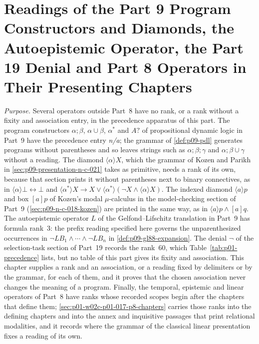 \chapter{Readings of the Part 9 Program Constructors and Diamonds, the Autoepistemic Operator, the Part 19 Denial and Part 8 Operators in Their Presenting Chapters}
\label{sec:p01-w02c-p01-017-readings}

\emph{Purpose.}  Several operators outside Part~8 have no rank,
or a rank without a fixity and association entry, in the precedence
apparatus of this part.  The program constructors \(\alpha;\beta\),
\(\alpha\cup\beta\), \(\alpha^{*}\) and \(A?\) of propositional dynamic
logic in Part~9 have the precedence entry \emph{n/a}; the grammar of
\cref{def:p09-pdl} generates programs without parentheses and so leaves
strings such as \(\alpha;\beta;\gamma\) and \(\alpha;\beta\cup\gamma\)
without a reading.  The diamond \(\langle\alpha\rangle X\), which the
grammar of Kozen and Parikh in \cref{sec:p09-presentation-n-c-021} takes
as primitive, needs a rank of its own, because that section prints it
without parentheses next to binary connectives, as in
\(\langle\alpha\rangle\bot\leftrightarrow\bot\) and
\(\langle\alpha^{*}\rangle X\to X\lor\langle\alpha^{*}\rangle(\neg
X\land\langle\alpha\rangle X)\).  The indexed diamond
\(\langle a\rangle p\) and box \([a]p\) of Kozen's modal
\(\mu\)-calculus in the model-checking section of Part~9
(\cref{sec:p09-n-c-018-kozen}) are printed in the same way, as in
\(\langle a\rangle p\land[a]q\).  The autoepistemic operator \(L\) of the
Gelfond--Lifschitz translation in Part~9 has formula rank~3: the prefix
reading specified here governs the unparenthesized occurrences in
\(\neg LB_1\land\cdots\land\neg LB_n\) in
\cref{def:p09-gl88-expansion}.  The denial \(\neg\) of the
selection-task section of Part~19 records the rank~60, which
Table~\ref{tab:p01-precedence} lists, but no table of this part gives its
fixity and association.  This chapter supplies a rank and an association,
or a reading fixed by delimiters or by the grammar, for each of them, and
it proves that the chosen association never changes the meaning of a
program.  Finally, the temporal, epistemic and linear operators of
Part~8 have ranks whose recorded scopes begin after the chapters that
define them; \cref{sec:p01-w02c-p01-017-p8-chapters} carries those ranks
into the defining chapters and into the annex and inquisitive passages
that print relational modalities, and it records where the grammar of the
classical linear presentation fixes a reading of its own.

